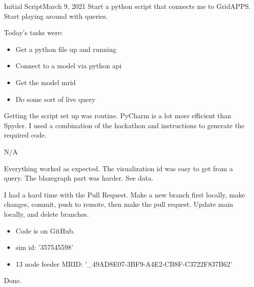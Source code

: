 
\begin{entry}{Initial Script}{March 9, 2021}
    \objective
    Start a python script that connects me to GridAPPS. Start playing around with queries.

    \outline

    Today's tasks were:
        \begin{itemize}
            \item Get a python file up and running
            \item Connect to a model via python api
            \item Get the model mrid
            \item Do some sort of live query
        \end{itemize}

    \procedures

        Getting the script set up was routine. PyCharm is a lot more efficient than Spyder.
        I used a combination of the hackathon and instructions to generate the required code.

    \parameters

    N/A

    \observations

        Everything worked as expected. The visualization id was easy to get from a query. The
        blazegraph part was harder. See data.

        I had a hard time with the Pull Request. Make a new branch first locally, make changes, commit, push to remote,
        then make the pull request. Update main locally, and delete branches.

    \data
    \begin{itemize}
        \item Code is on GitHub.
        \item sim id: '357545598'
        \item 13 node feeder MRID: '_49AD8E07-3BF9-A4E2-CB8F-C3722F837B62'
    \end{itemize}




    \results

    Done.

\end{entry}